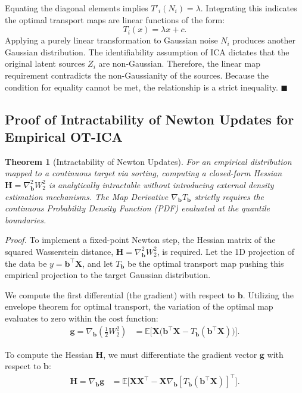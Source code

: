 \documentclass{tpm2026} %
\newtheorem{theorem}{Theorem}
\begin{document}
Equating the diagonal elements implies $T'_i(N_i) = \lambda$. Integrating this indicates the optimal transport maps are linear functions of the form:
\begin{equation}
    T_i(x) = \lambda x + c.
\end{equation}
Applying a purely linear transformation to Gaussian noise $N_i$ produces another Gaussian distribution. The identifiability assumption of ICA dictates that the original latent sources $Z_i$ are non-Gaussian. Therefore, the linear map requirement contradicts the non-Gaussianity of the sources. Because the condition for equality cannot be met, the relationship is a strict inequality. $\blacksquare$

\subsection{Proof of Intractability of Newton Updates for Empirical OT-ICA}
\begin{theorem}[Intractability of Newton Updates]
For an empirical distribution mapped to a continuous target via sorting, computing a closed-form Hessian $\mathbf{H} = \nabla^2_{\mathbf{b}} W_2^2$ is analytically intractable without introducing external density estimation mechanisms. The Map Derivative $\nabla_{\mathbf{b}} T_{\mathbf{b}}$ strictly requires the continuous Probability Density Function (PDF) evaluated at the quantile boundaries.
\end{theorem}

\textit{Proof.} To implement a fixed-point Newton step, the Hessian matrix of the squared Wasserstein distance, $\mathbf{H} = \nabla^2_{\mathbf{b}} W_2^2$, is required. Let the 1D projection of the data be $y = \mathbf{b}^\top \mathbf{X}$, and let $T_{\mathbf{b}}$ be the optimal transport map pushing this empirical projection to the target Gaussian distribution. 

We compute the first differential (the gradient) with respect to $\mathbf{b}$. Utilizing the envelope theorem for optimal transport, the variation of the optimal map evaluates to zero within the cost function:
\begin{align}
    \mathbf{g} = \nabla_{\mathbf{b}} \left( \frac{1}{2} W_2^2 \right) &= \mathbb{E}\Big[ \mathbf{X} \big( \mathbf{b}^\top \mathbf{X} - T_{\mathbf{b}}(\mathbf{b}^\top \mathbf{X}) \big) \Big].
\end{align}

To compute the Hessian $\mathbf{H}$, we must differentiate the gradient vector $\mathbf{g}$ with respect to $\mathbf{b}$:
\begin{align}
    \mathbf{H} = \nabla_{\mathbf{b}} \mathbf{g} &= \mathbb{E}\Big[ \mathbf{X} \mathbf{X}^\top - \mathbf{X} \nabla_{\mathbf{b}} [T_{\mathbf{b}}(\mathbf{b}^\top \mathbf{X})]^\top \Big].
\end{align}
\end{document}
